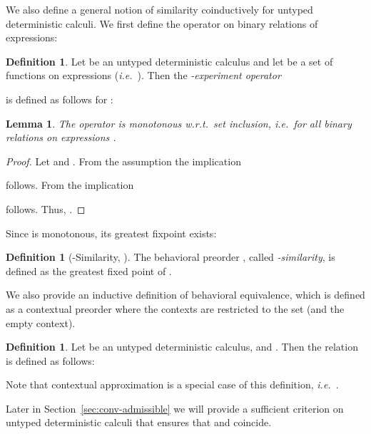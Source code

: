 \documentclass{LMCS}
\theoremstyle{plain}
\newtheorem{lemma}[thm]{Lemma}
\theoremstyle{definition}
\newtheorem{definition}[thm]{Definition}
\newcommand{\ie}{{\em i.e.}}
\newcommand{\wrt}{{\em w.r.t.}}
\begin{document}
We also define a general notion of similarity coinductively for untyped
deterministic calculi.
We first define the operator  on binary relations of 
expressions:
\begin{definition}
Let  be an untyped deterministic
calculus and let   be a set of functions on 
expressions (\ie\ ).
Then the {\em -experiment operator} 
  
is defined as follows for :

\end{definition}

\begin{lemma}
The operator  is monotonous \wrt\ set inclusion, \ie\ for all
binary relations  on expressions 
.
\end{lemma}
\begin{proof}
Let  and . 
From the assumption  the implication 
 
follows.
From  the implication

follows.
Thus, .
\end{proof}
\noindent Since  is monotonous, its greatest fixpoint exists:
\begin{definition}[-Similarity, ]\label{def:Q-gfp-preorder}
The behavioral preorder , called {\em -similarity},
is defined as the greatest fixed point of .
\end{definition}

We also provide an inductive definition of behavioral equivalence, which is
defined as a contextual preorder where the contexts are restricted to the set
 (and the empty context).

\begin{definition}\label{def:Q-simpl-preorder}
Let  be an untyped 
deterministic calculus, and .
Then the relation  is defined as follows:

\end{definition}
Note that contextual approximation is a special case of this definition,
\ie\ .

Later in Section~\ref{sec:conv-admissible} we will provide a sufficient
criterion on untyped deterministic calculi that ensures that 
 and  coincide.
\end{document}
